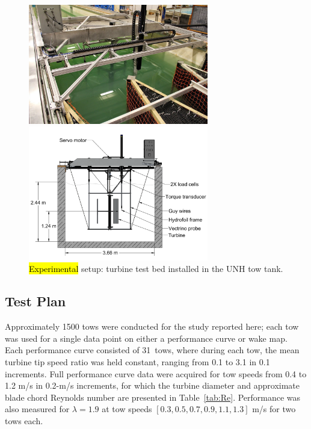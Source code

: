 \documentclass[energies,article,accept,moreauthors,pdftex,10pt,a4paper]{mdpi}
\theoremstyle{mdpi}
\newcounter{ex}
\newcounter{re}
\begin{document}
\begin{figure}[H]
 \centering

 \includegraphics[width=0.7\textwidth]{figures/exp-setup-photo}
 
 \includegraphics[width=0.7\textwidth]{figures/exp_setup_drawing}
 
 \caption{\hl {Experimental} setup: turbine test bed installed in the UNH tow tank.}
 
 \label{fig:exp-setup}
\end{figure}


\subsection{Test Plan}

Approximately 1500 tows were conducted for the study reported here; each tow was
used for a single data point on either a performance curve or wake map. Each
performance curve consisted of 31~tows, where during each tow, the mean turbine
tip speed ratio was held constant, ranging from 0.1 to 3.1 in 0.1 increments. Full
performance curve data were acquired for tow speeds from 0.4 to 1.2 m/s in 0.2-m/s increments, for which the turbine diameter and approximate blade chord Reynolds
number are presented in Table~\ref{tab:Re}. Performance was also measured for
$\lambda=1.9$ at tow speeds $[0.3, 0.5, 0.7, 0.9, 1.1, 1.3]$ m/s for two tows
each.
\end{document}
